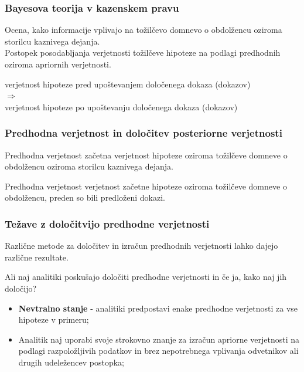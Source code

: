 \documentclass{beamer}
\begin{document}
\begin{frame}
    \frametitle{Bayesova teorija v kazenskem pravu}
    Ocena, kako informacije vplivajo na tožilčevo domnevo o obdolžencu oziroma storilcu kaznivega dejanja. \\ \vspace{3mm}
    Postopek posodabljanja verjetnosti tožilčeve hipoteze na podlagi predhodnih oziroma apriornih verjetnosti. \\ \vspace{3mm}
    \begin{block}{}
        \centering
        verjetnost hipoteze pred upoštevanjem določenega dokaza (dokazov) \\ \vspace{2mm}
        $\Rightarrow$ \\ \vspace{3mm}
        verjetnost hipoteze po upoštevanju določenega dokaza (dokazov)
    \end{block}
\end{frame}

\begin{frame}
    \frametitle{Predhodna verjetnost in določitev posteriorne verjetnosti}
    \begin{block}{Predhodna verjetnost}
        začetna verjetnost hipoteze oziroma tožilčeve domneve o obdolžencu oziroma storilcu kaznivega dejanja.
    \end{block} \vspace{3mm}
    \begin{block}{Predhodna verjetnost}
        verjetnost začetne hipoteze oziroma tožilčeve domneve o obdolžencu, preden so bili predloženi dokazi.
    \end{block}
\end{frame}

\begin{frame}
    \frametitle{Težave z določitvijo predhodne verjetnosti}
    Različne metode za določitev in izračun predhodnih verjetnosti lahko dajejo različne rezultate. \\ \vspace{3mm}
    \begin{block}{Ali naj analitiki poskušajo določiti predhodne verjetnosti in če ja, kako naj jih določijo?}
        \begin{itemize}
            \item \textbf{Nevtralno stanje} - analitiki predpostavi enake predhodne verjetnosti za vse hipoteze v primeru;
            \item Analitik naj uporabi svoje strokovno znanje za izračun apriorne verjetnosti na podlagi razpoložljivih podatkov in brez nepotrebnega vplivanja odvetnikov ali drugih udeležencev postopka;
        \end{itemize}
    \end{block}
\end{frame}
\end{document}
